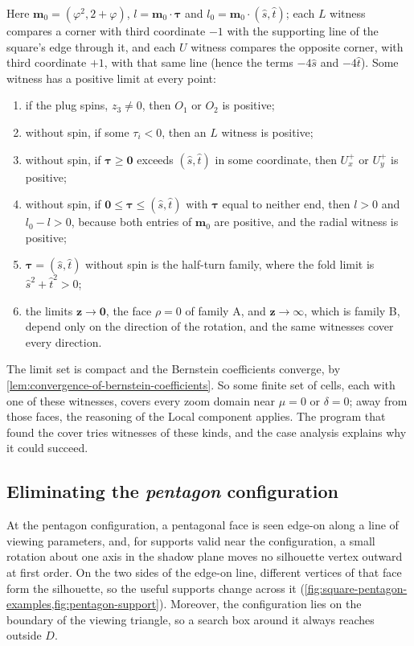 \begin{remark}
Here $\mathbf m_0=(\varphi^2,2+\varphi)$, $l=\mathbf m_0\cdot\boldsymbol\tau$ and
$l_0=\mathbf m_0\cdot(\widehat s,\widehat t)$; each $L$ witness compares a corner
with third coordinate $-1$ with the supporting line of the square's edge
through it, and each $U$ witness compares the opposite corner, with third
coordinate $+1$, with that same line (hence the terms $-4\widehat s$ and
$-4\widehat t$).
Some witness has a positive limit at every point:
\begin{enumerate}
  \item if the plug spins, $z_3\ne0$, then $O_1$ or $O_2$ is positive;
  \item without spin, if some $\tau_i<0$, then an $L$ witness is positive;
  \item without spin, if $\boldsymbol\tau\ge\mathbf0$ exceeds $(\widehat s,\widehat t)$ in some
    coordinate, then $U_x^+$ or $U_y^+$ is positive;
  \item without spin, if $\mathbf0\le\boldsymbol\tau\le(\widehat s,\widehat t)$ with
    $\boldsymbol\tau$ equal to neither end, then $l>0$ and $l_0-l>0$, because both
    entries of $\mathbf m_0$ are positive, and the radial witness is positive;
  \item $\boldsymbol\tau=(\widehat s,\widehat t)$ without spin is the half-turn family, where
    the fold limit is $\widehat s^2+\widehat t^2>0$;
  \item the limits $\mathbf z\to\mathbf0$, the face $\rho=0$ of family A, and
    $\mathbf z\to\infty$, which is family B, depend only on the direction of the
    rotation, and the same witnesses cover every direction.
\end{enumerate}
The limit set is compact and the Bernstein coefficients converge, by
\cref{lem:convergence-of-bernstein-coefficients}. So some finite set of
cells, each with one of these witnesses, covers every zoom domain near
$\mu=0$ or $\delta=0$; away from those faces, the reasoning of the Local
component applies. The program that found the cover tries witnesses of
these kinds, and the case analysis explains why it could succeed.
\end{remark}

\subsection{Eliminating the \emph{pentagon} configuration}\label{subsec:eliminating-the-pentagon-configuration}

At the pentagon configuration, a pentagonal face is seen edge-on along a
line of viewing parameters, and, for supports valid near the configuration,
a small rotation about one axis in the shadow plane moves no silhouette
vertex outward at first order. On the two
sides of the edge-on line, different vertices of that face form the
silhouette, so the useful supports change across it
(\cref{fig:square-pentagon-examples,fig:pentagon-support}). Moreover, the
configuration lies on the boundary of the viewing triangle, so a search box
around it always reaches outside $D$.

